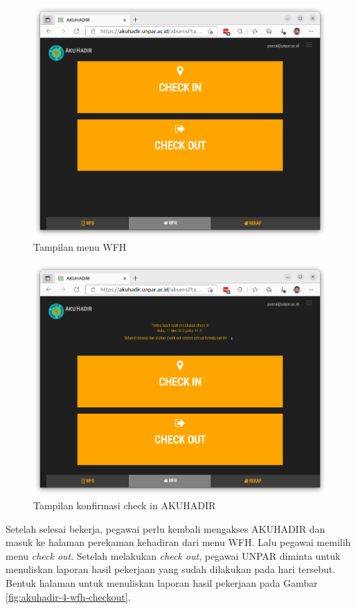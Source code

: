 \begin{figure}[H]
	\centering
	\includegraphics[scale=0.3]{Gambar/akuhadir-2-wfh.png}
	\caption{Tampilan menu WFH} 
	\label{fig:akuhadir-2-wfh}
\end{figure}

\begin{figure}[H]
	\centering
	\includegraphics[scale=0.28]{Gambar/akuhadir-3-wfh-checkin.png}
	\caption{Tampilan konfirmasi check in AKUHADIR} 
	\label{fig:akuhadir-3-wfh-checkin}
\end{figure}

Setelah selesai bekerja, pegawai perlu kembali mengakses AKUHADIR dan masuk ke halaman perekaman kehadiran dari menu WFH. Lalu pegawai memilih menu \textit{check out}. Setelah melakukan \textit{check out}, pegawai UNPAR diminta untuk menuliskan laporan hasil pekerjaan yang sudah dilakukan pada hari tersebut. Bentuk halaman untuk menuliskan laporan hasil pekerjaan pada Gambar \ref{fig:akuhadir-4-wfh-checkout}.

